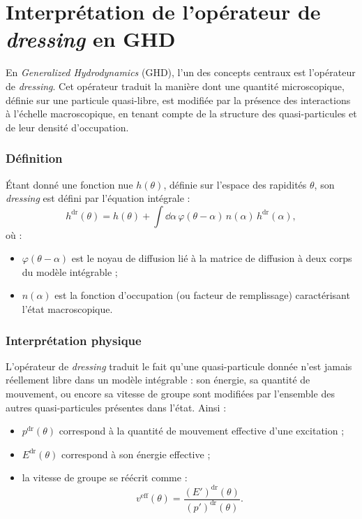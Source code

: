 
\chapter{Interprétation de l'opérateur de \textit{dressing} en GHD}

En \textit{Generalized Hydrodynamics} (GHD), l’un des concepts centraux est
l’opérateur de \textit{dressing}. Cet opérateur traduit la manière dont une quantité
microscopique, définie sur une particule quasi-libre, est modifiée par la présence
des interactions à l’échelle macroscopique, en tenant compte de la structure des
quasi-particules et de leur densité d’occupation.

\subsection*{Définition}

Étant donné une fonction nue $h(\theta)$, définie sur l’espace des rapidités
$\theta$, son \textit{dressing} est défini par l’équation intégrale :
\begin{equation}
    h^{\mathrm{dr}}(\theta) = h(\theta) + \int \dd{\alpha}\,
    \varphi(\theta-\alpha)\, n(\alpha)\, h^{\mathrm{dr}}(\alpha),
\end{equation}
où :
\begin{itemize}
    \item $\varphi(\theta-\alpha)$ est le noyau de diffusion lié à la matrice de
    diffusion à deux corps du modèle intégrable ;
    \item $n(\alpha)$ est la fonction d’occupation (ou facteur de remplissage)
    caractérisant l’état macroscopique.
\end{itemize}

\subsection*{Interprétation physique}

L’opérateur de \textit{dressing} traduit le fait qu’une quasi-particule donnée
n’est jamais réellement libre dans un modèle intégrable : son énergie, sa
quantité de mouvement, ou encore sa vitesse de groupe sont modifiées par
l’ensemble des autres quasi-particules présentes dans l’état.
Ainsi :
\begin{itemize}
    \item $p^{\mathrm{dr}}(\theta)$ correspond à la quantité de mouvement
    effective d’une excitation ;
    \item $E^{\mathrm{dr}}(\theta)$ correspond à son énergie effective ;
    \item la vitesse de groupe se réécrit comme :
    \begin{equation}
        v^{\mathrm{eff}}(\theta) =
        \frac{(E')^{\mathrm{dr}}(\theta)}{(p')^{\mathrm{dr}}(\theta)}.
    \end{equation}
\end{itemize}

